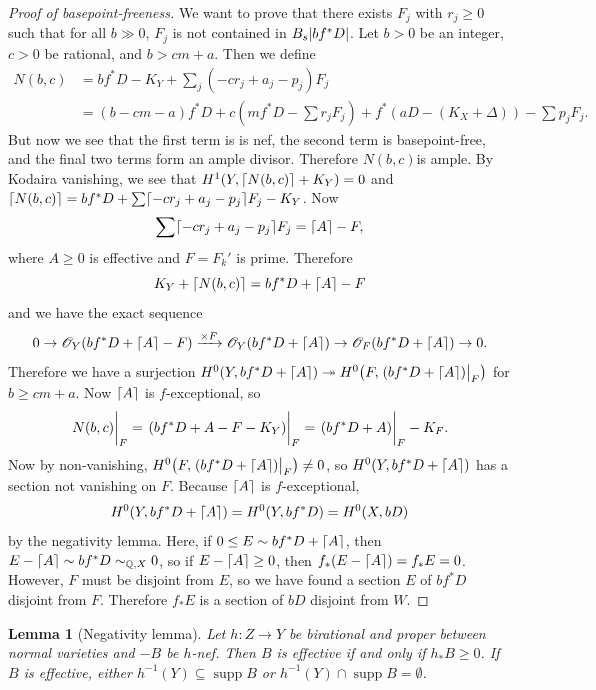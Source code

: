 \documentclass[leqno, openany]{memoir}
\DeclarePairedDelimiter{\ceil}{\lceil}{\rceil}
\newtheorem{lem}[thm]{Lemma}
\theoremstyle{definition}
\theoremstyle{remark}
\theoremstyle{plain}
\theoremstyle{definition}
\theoremstyle{remark}
\newcommand{\Q}{\mathbb{Q}}
\newcommand{\msc}[1]{\mathscr{#1}}
\begin{document}
\begin{proof}[Proof of basepoint-freeness]
    We want to prove that there exists $F_j$ with $r_j \geq 0$ such that for all $b \gg 0$, $F_j$ is not contained in $B_s \abs{bf^* D}$. Let $b > 0$ be an integer, $c > 0$ be rational, and $b > cm + a$. Then we define
    \begin{align*} 
        N(b, c) &= b f^* D - K_Y + \sum_j (-c r_j + a_j - p_j) F_j \\
                &= (b - cm - a) f^* D + c(mf^* D - \sum r_j F_j) + f^*(aD - (K_X+\Delta)) - \sum p_j F_j.
    \end{align*}
    But now we see that the first term is is nef, the second term is basepoint-free, and the final two terms form an ample divisor. Therefore $N(b,c)$is ample. By Kodaira vanishing, we see that $H^1(Y, \ceil{N(b, c)} + K_Y) = 0$ and $\ceil{N(b, c)} = bf^* D + \sum \ceil{- c r_j + a_j - p_j} F_j - K_Y$. Now
    \[ \sum \ceil{- c r_j + a_j - p_j} F_j = \ceil{A} - F, \]
    where $A \geq 0$ is effective and $F = F_k'$ is prime. Therefore
    \[ K_Y + \ceil{N(b,c)} = b f^* D + \ceil{A} - F \]
    and we have the exact sequence
    \[ 0 \to \msc{O}_Y(bf^*D + \ceil{A} - F) \xrightarrow{\times F} \msc{O}_Y(bf^* D + \ceil{A}) \to \msc{O}_F(bf^* D + \ceil{A}) \to 0. \]
    Therefore we have a surjection $H^0(Y, bf^* D + \ceil{A}) \twoheadrightarrow H^0\qty(F, \eval{( bf^* D + \ceil{A} )}_F)$ for $b \geq cm + a$. Now $\ceil{A}$ is $f$-exceptional, so
    \[ \eval{N(b, c)}_F = \eval{( bf^* D + A - F - K_Y )}_F = \eval{(bf^* D + A)}_F - K_F. \]
    Now by non-vanishing, $H^0\qty(F, \eval{ (bf^* D + \ceil{A}) }_F) \neq 0$, so $H^0(Y, bf^* D + \ceil{A})$ has a section not vanishing on $F$. Because $\ceil{A}$ is $f$-exceptional, 
    \[ H^0(Y, bf^* D + \ceil{A}) = H^0(Y, bf^* D) = H^0(X, bD) \]
    by the negativity lemma. Here, if $0 \leq E \sim bf^* D + \ceil{A}$, then $E - \ceil{A} \sim bf^* D \sim_{\Q, X} 0$, so if $E - \ceil{A} \geq 0$, then $f_* (E - \ceil{A}) = f_* E = 0$. However, $F$ must be disjoint from $E$, so we have found a section $E$ of $bf^* D$ disjoint from $F$. Therefore $f_* E$ is a section of $bD$ disjoint from $W$.
\end{proof}

\begin{lem}[Negativity lemma]
    Let $h \colon Z \to Y$ be birational and proper between normal varieties and $-B$ be $h$-nef. Then $B$ is effective if and only if $h_* B \geq 0$. If $B$ is effective, either $h^{-1}(Y) \subseteq \operatorname{supp} B$ or $h^{-1}(Y) \cap \operatorname{supp} B = \emptyset$.
\end{lem}
\end{document}
